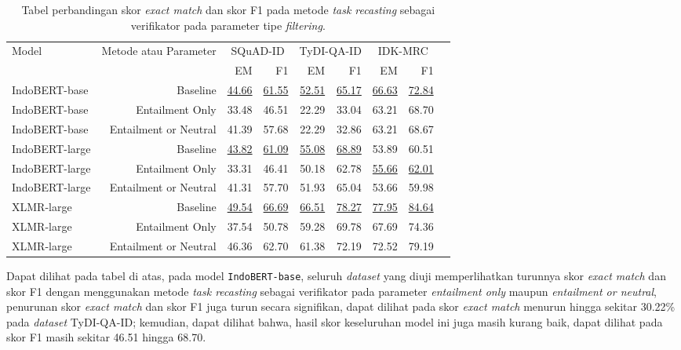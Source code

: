 \begin{table}[H]\centering
\small
\begin{tabular}{lrrrrrrrr}\toprule
\multirow{2}{*}{Model} &\multirow{2}{*}{Metode atau Parameter} &\multicolumn{2}{c}{SQuAD-ID} &\multicolumn{2}{c}{TyDI-QA-ID} &\multicolumn{2}{c}{IDK-MRC} \\\cmidrule{3-8}
& &EM &F1 &EM &F1 &EM &F1 \\\midrule
IndoBERT-base &Baseline &\underline{44.66} &\underline{61.55} &\underline{52.51} &\underline{65.17} &\underline{66.63} &\underline{72.84} \\
IndoBERT-base &Entailment Only &33.48 &46.51 &22.29 &33.04 &63.21 &68.70 \\
IndoBERT-base &Entailment or Neutral &41.39 &57.68 &22.29 &32.86 &63.21 &68.67 \\
\hline
IndoBERT-large &Baseline &\underline{43.82} &\underline{61.09} &\underline{55.08} &\underline{68.89} &53.89 &60.51 \\
IndoBERT-large &Entailment Only &33.31 &46.41 &50.18 &62.78 &\underline{55.66} &\underline{62.01} \\
IndoBERT-large &Entailment or Neutral &41.31 &57.70 &51.93 &65.04 &53.66 &59.98 \\
\hline
XLMR-large &Baseline &\underline{49.54} &\underline{66.69} &\underline{66.51} &\underline{78.27} &\underline{77.95} &\underline{84.64} \\
XLMR-large &Entailment Only &37.54 &50.78 &59.28 &69.78 &67.69 &74.36 \\
XLMR-large &Entailment or Neutral &46.36 &62.70 &61.38 &72.19 &72.52 &79.19 \\
\bottomrule
\end{tabular}
\caption{Tabel perbandingan skor \emph{exact match} dan skor F1 pada metode \emph{task recasting} sebagai verifikator pada parameter tipe \emph{filtering}.}
\end{table}

Dapat dilihat pada tabel di atas, pada model \texttt{IndoBERT-base}, seluruh \emph{dataset} yang diuji memperlihatkan turunnya skor \emph{exact match} dan skor F1 dengan menggunakan metode \emph{task recasting} sebagai verifikator pada parameter \emph{entailment only} maupun \emph{entailment or neutral}, penurunan skor \emph{exact match} dan skor F1 juga turun secara signifikan, dapat dilihat pada skor \emph{exact match} menurun hingga sekitar 30.22\% pada \emph{dataset} TyDI-QA-ID; kemudian, dapat dilihat bahwa, hasil skor keseluruhan model ini juga masih kurang baik, dapat dilihat pada skor F1 masih sekitar 46.51 hingga 68.70.

